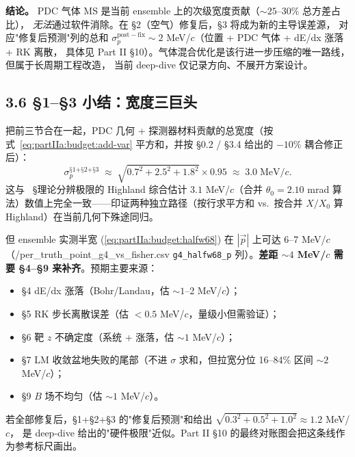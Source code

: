 \textbf{结论。} PDC 气体 MS 是当前 ensemble 上的次级宽度贡献（$\sim 25$--$30\%$ 总方差占比），
\emph{无法}通过软件消除。在 §2（空气）修复后，§3 将成为新的主导误差源，
对应"修复后预测"列的总和 $\sigma_p^\mathrm{post-fix}\sim 2$ MeV/$c$（位置 + PDC 气体 + dE/dx 涨落 + RK 离散，
具体见 Part II §10）。气体混合优化是该行进一步压缩的唯一路线，但属于长周期工程改造，
当前 deep-dive 仅记录方向、不展开方案设计。

\subsection*{3.6 §1--§3 小结：宽度三巨头}

把前三节合在一起，PDC 几何 + 探测器材料贡献的总宽度（按式~\eqref{eq:partIIa:budget:add-var} 平方和，并按 §0.2 / §3.4 给出的 $-10\%$ 耦合修正后）：
\begin{equation}
  \sigma_p^{\text{§1+§2+§3}}
   \;\approx\;\sqrt{0.7^2+2.5^2+1.8^2}\times 0.95
   \;\approx\; 3.0\;\mathrm{MeV}/c.
  \label{eq:partIIa:budget:rows123-sum}
\end{equation}
这与 \StatusReport{}~§理论分辨极限的 Highland 综合估计 $3.1$ MeV/$c$（合并 $\theta_0=2.10$ mrad 算法）数值上完全一致——印证两种独立路径（按行求平方和 vs.~按合并 $X/X_0$ 算 Highland）在当前几何下殊途同归。

但 ensemble 实测半宽 (\ref{eq:partIIa:budget:halfw68}) 在 $|\vec p|$ 上可达 6--7 MeV/$c$（\DeepDiveData{}/per\_truth\_point\_g4\_vs\_fisher.csv \texttt{g4\_halfw68\_p} 列）。\textbf{差距 $\sim 4$ MeV/$c$ 需要 §4--§9 来补齐}。预期主要来源：
\begin{itemize}
  \item §4 dE/dx 涨落（Bohr/Landau，估 $\sim 1$--2 MeV/$c$）；
  \item §5 RK 步长离散误差（估 $< 0.5$ MeV/$c$，量级小但需验证）；
  \item §6 靶 $z$ 不确定度（系统 + 涨落，估 $\sim 1$ MeV/$c$）；
  \item §7 LM 收敛盆地失败的尾部（不进 $\sigma$ 求和，但拉宽分位 16--84\% 区间 $\sim 2$ MeV/$c$）；
  \item §9 $B$ 场不均匀（估 $\sim 1$ MeV/$c$）。
\end{itemize}
若全部修复后，§1+§2+§3 的"修复后预测"和给出 $\sqrt{0.3^2 + 0.5^2 + 1.0^2}\approx 1.2$ MeV/$c$，
是 deep-dive 给出的"硬件极限"近似。Part II §10 的最终对账图会把这条线作为参考标尺画出。


